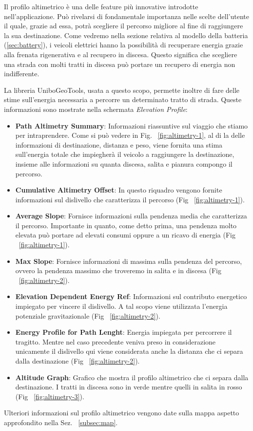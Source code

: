 Il profilo altimetrico è una delle feature più innovative introdotte nell'applicazione. Può rivelarsi di fondamentale importanza nelle scelte dell'utente il quale, grazie ad essa, potrà scegliere il percorso migliore al fine di raggiungere la sua destinazione. Come vedremo nella sezione relativa al modello della batteria (\ref{sec:battery}), i veicoli elettrici hanno la possibilità di recuperare energia grazie alla frenata rigenerativa e al recupero in discesa. Questo significa che scegliere una strada con molti tratti in discesa può portare un recupero di energia non indifferente. 

La libreria UniboGeoTools, usata a questo scopo, permette inoltre di fare delle stime sull'energia necessaria a percorre un determinato tratto di strada. Queste informazioni sono mostrate nella schermata \emph{Elevation Profile}:

\begin{itemize}
	\item \textbf{Path Altimetry Summary}: Informazioni riassuntive sul viaggio che stiamo per intraprendere. Come si può vedere in Fig. ~\ref{fig:altimetry-1}, al di la delle informazioni di destinazione, distanza e peso, viene fornita una stima sull'energia totale che impiegherà il veicolo a raggiungere la destinazione, insieme alle informazioni su quanta discesa, salita e pianura compongo il percorso.
	\item \textbf{Cumulative Altimetry Offset}: In questo riquadro vengono fornite informazioni sul dislivello che caratterizza il percorso (Fig ~\ref{fig:altimetry-1}).
	\item \textbf{Average Slope}: Fornisce informazioni sulla pendenza media che caratterizza il percorso. Importante in quanto, come detto prima, una pendenza molto elevata può portare ad elevati consumi oppure a un ricavo di energia (Fig ~\ref{fig:altimetry-1}).
	\item \textbf{Max Slope}: Fornisce informazioni di massima sulla pendenza del percorso, ovvero la pendenza massimo che troveremo in salita e in discesa (Fig ~\ref{fig:altimetry-2}).
	\item \textbf{Elevation Dependent Energy Ref}: Informazioni sul contributo energetico impiegato per vincere il dislivello. A tal scopo viene utilizzata l'energia potenziale gravitazionale (Fig ~\ref{fig:altimetry-2}).
	\item \textbf{Energy Profile for Path Lenght}: Energia impiegata per percorrere il tragitto. Mentre nel caso precedente veniva preso in considerazione unicamente il dislivello qui viene considerata anche la distanza che ci separa dalla destinazione (Fig ~\ref{fig:altimetry-2}).
	\item \textbf{Altitude Graph}: Grafico che mostra il profilo altimetrico che ci separa dalla destinazione. I tratti in discesa sono in verde mentre quelli in salita in rosso (Fig ~\ref{fig:altimetry-3}).
\end{itemize} 
\noindent
Ulteriori informazioni sul profilo altimetrico vengono date sulla mappa aspetto approfondito nella Sez. ~\ref{subsec:map}.

